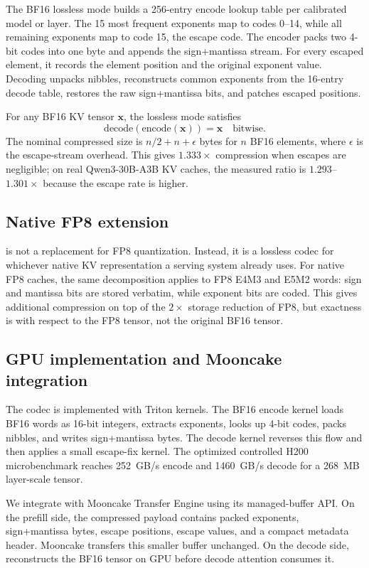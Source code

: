The BF16 lossless mode builds a 256-entry encode lookup table per calibrated model or layer. The 15 most frequent exponents map to codes 0--14, while all remaining exponents map to code 15, the escape code. The encoder packs two 4-bit codes into one byte and appends the sign+mantissa stream. For every escaped element, it records the element position and the original exponent value. Decoding unpacks nibbles, reconstructs common exponents from the 16-entry decode table, restores the raw sign+mantissa bits, and patches escaped positions.

For any BF16 KV tensor $\mathbf{x}$, the lossless mode satisfies
\[
  \mathrm{decode}(\mathrm{encode}(\mathbf{x})) = \mathbf{x}
  \quad\text{bitwise.}
\]
The nominal compressed size is $n/2+n+\epsilon$ bytes for $n$ BF16 elements, where $\epsilon$ is the escape-stream overhead. This gives $1.333\times$ compression when escapes are negligible; on real Qwen3-30B-A3B KV caches, the measured ratio is $1.293$--$1.301\times$ because the escape rate is higher.

\subsection{Native FP8 extension}
\label{sec:fp8-codec}

\splitzip is not a replacement for FP8 quantization. Instead, it is a lossless codec for whichever native KV representation a serving system already uses. For native FP8 caches, the same decomposition applies to FP8 E4M3 and E5M2 words: sign and mantissa bits are stored verbatim, while exponent bits are coded. This gives additional compression on top of the $2\times$ storage reduction of FP8, but exactness is with respect to the FP8 tensor, not the original BF16 tensor.

\subsection{GPU implementation and Mooncake integration}

The codec is implemented with Triton kernels. The BF16 encode kernel loads BF16 words as 16-bit integers, extracts exponents, looks up 4-bit codes, packs nibbles, and writes sign+mantissa bytes. The decode kernel reverses this flow and then applies a small escape-fix kernel. The optimized controlled H200 microbenchmark reaches 252~GB/s encode and 1460~GB/s decode for a 268~MB layer-scale tensor.

We integrate \splitzip with Mooncake Transfer Engine using its managed-buffer API. On the prefill side, the compressed payload contains packed exponents, sign+mantissa bytes, escape positions, escape values, and a compact metadata header. Mooncake transfers this smaller buffer unchanged. On the decode side, \splitzip reconstructs the BF16 tensor on GPU before decode attention consumes it.

